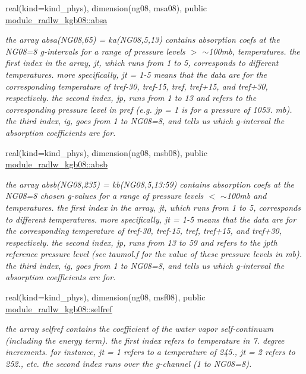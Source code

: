 \begin{Indent}
\begin{DoxyCompactItemize}
real(kind=kind\+\_\+phys), dimension(ng08, msa08), public \hyperlink{group__module__radlw__kgbnn_gaba1018958264bbc6fbf7f190fea91fa5}{module\+\_\+radlw\+\_\+kgb08\+::absa}
\begin{DoxyCompactList}\small\item\em the array absa(\+N\+G08,65) = ka(\+N\+G08,5,13) contains absorption coefs at the N\+G08=8 g-\/intervals for a range of pressure levels $>$ $\sim$100mb, temperatures. the first index in the array, jt, which runs from 1 to 5, corresponds to different temperatures. more specifically, jt = 1-\/5 means that the data are for the corresponding temperature of tref-\/30, tref-\/15, tref, tref+15, and tref+30, respectively. the second index, jp, runs from 1 to 13 and refers to the corresponding pressure level in pref (e.\+g. jp = 1 is for a pressure of 1053. mb). the third index, ig, goes from 1 to N\+G08=8, and tells us which g-\/interval the absorption coefficients are for. \end{DoxyCompactList}\item 
real(kind=kind\+\_\+phys), dimension(ng08, msb08), public \hyperlink{group__module__radlw__kgbnn_ga23d4352fcafb0394d723e2f080a84ece}{module\+\_\+radlw\+\_\+kgb08\+::absb}
\begin{DoxyCompactList}\small\item\em the array absb(\+N\+G08,235) = kb(\+N\+G08,5,13\+:59) contains absorption coefs at the N\+G08=8 chosen g-\/values for a range of pressure levels $<$ $\sim$100mb and temperatures. the first index in the array, jt, which runs from 1 to 5, corresponds to different temperatures. more specifically, jt = 1-\/5 means that the data are for the corresponding temperature of tref-\/30, tref-\/15, tref, tref+15, and tref+30, respectively. the second index, jp, runs from 13 to 59 and refers to the jpth reference pressure level (see taumol.\+f for the value of these pressure levels in mb). the third index, ig, goes from 1 to N\+G08=8, and tells us which g-\/interval the absorption coefficients are for. \end{DoxyCompactList}\item 
real(kind=kind\+\_\+phys), dimension(ng08, msf08), public \hyperlink{group__module__radlw__kgbnn_ga2c38561d26f86f7ae515b433843c4e5d}{module\+\_\+radlw\+\_\+kgb08\+::selfref}
\begin{DoxyCompactList}\small\item\em the array selfref contains the coefficient of the water vapor self-\/continuum (including the energy term). the first index refers to temperature in 7. degree increments. for instance, jt = 1 refers to a temperature of 245., jt = 2 refers to 252., etc. the second index runs over the g-\/channel (1 to N\+G08=8). \end{DoxyCompactList}\item 

\end{DoxyCompactItemize}
\end{Indent}
